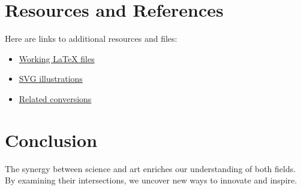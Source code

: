 \section{Resources and References}
Here are links to additional resources and files:
\begin{itemize}
    \item \href{./workingish\ latex}{Working LaTeX files}
    \item \href{./svgs}{SVG illustrations}
    \item \href{./dconv}{Related conversions}
\end{itemize}

\section{Conclusion}
The synergy between science and art enriches our understanding of both fields. By examining their intersections, we uncover new ways to innovate and inspire.
